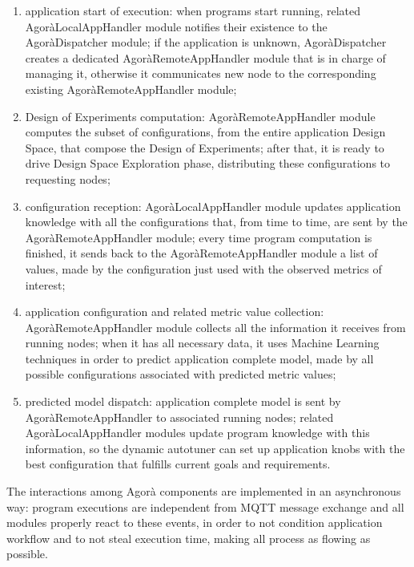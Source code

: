 \begin{enumerate}

    \item application start of execution: when programs start running, related AgoràLocalAppHandler module notifies their existence to the AgoràDispatcher module; if the application is unknown, AgoràDispatcher creates a dedicated AgoràRemoteAppHandler module that is in charge of managing it, otherwise it communicates new node to the corresponding existing AgoràRemoteAppHandler module;
    
    \item Design of Experiments computation: AgoràRemoteAppHandler module computes the subset of configurations, from the entire application Design Space, that compose the Design of Experiments; after that, it is ready to drive Design Space Exploration phase, distributing these configurations to requesting nodes;
    
    \item configuration reception: AgoràLocalAppHandler module updates application knowledge with all the configurations that, from time to time, are sent by the AgoràRemoteAppHandler module; every time program computation is finished, it sends back to the AgoràRemoteAppHandler module a list of values, made by the configuration just used with the observed metrics of interest;
    
    \item application configuration and related metric value collection: A\-go\-rà\-Remote\-App\-Handler module collects all the information it receives from running nodes; when it has all necessary data, it uses Machine Learning techniques in order to predict application complete model, made by all possible configurations associated with predicted metric values;
    
    \item predicted model dispatch: application complete model is sent by AgoràRemoteAppHandler to associated running nodes; related AgoràLocalAppHandler modules update program knowledge with this information, so the dynamic autotuner can set up application knobs with the best configuration that fulfills current goals and requirements.

\end{enumerate}

The interactions among Agorà components are implemented in an asynchronous way: program executions are independent from MQTT message exchange and all modules properly react to these events, in order to not condition application workflow and to not steal execution time, making all process as flowing as possible.
